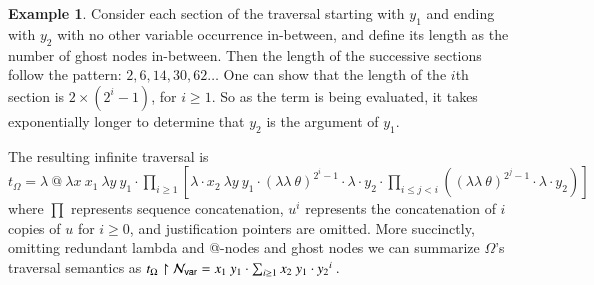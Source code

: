 \documentclass{elsarticle}
\newif\iflongversion
\theoremstyle{plain}
\theoremstyle{definition}
\newtheorem{example}{Example}[section]
\newcommand\Nodes{\mathcal{N}}%
\newcommand\NodesVar{\Nodes_{\sf var}}%
\newcommand{\ghostlmd}{{\lambda\!\!\lambda}}
\newcommand{\ghostvar}{\theta}
\newcommand\ExtendedNodesVar{\NodesVar^\ghostvar}
\begin{document}
\begin{example}
    Consider each section of the traversal starting with $y_1$ and ending with $y_2$ with no other variable occurrence in-between, and define its length as the number of ghost nodes in-between. Then the length of the successive sections follow the pattern: $2,6,14,30,62\ldots$
    One can show that the length of the $i$th section is $2\times(2^i-1)$, for $i\geq1$.
    So as the term is being evaluated, it takes exponentially longer to determine that $y_2$ is the argument of $y_1$.
\iflongversion
    The resulting infinite traversal is expressed as follows:
    \begin{equation*}
    t_\Omega = \lambda ~ @ ~ \lambda x ~  x_1 ~ \lambda y ~ y_1
    \cdot  \sum_{i\geq 1}
        \left[
            \lambda \cdot x_2 ~ \lambda y ~ y_1 \cdot
             {(\ghostlmd\ \ghostvar)}^{2^i -1}\cdot \lambda \cdot y_2
                 \cdot \sum_{i\leq j<i}
                    \left(
                        {(\ghostlmd\ \ghostvar)}^{2^j -1}
                        \cdot
                        \lambda \cdot y_2
                    \right)
        \right]
    \end{equation*}
    where $\prod$ represents sequence concatenation and $u^i$ represents the concatenation of $i$ copies of $u$ for $i\geq 0$, and justification pointers are omitted.

    More succinctly, omitting redundant lambda and @-nodes to keep only variable nodes:
    $t_\Omega \filter \ExtendedNodesVar =  x_1 ~ y_1
        \cdot  \prod_{i\geq 1}
            \left[
                x_2 ~ y_1 \cdot
                 \ghostvar^{2^i -1}\cdot y_2 \cdot
                     \prod_{1\leq j <i} (\ghostvar^{2^j -1} \cdot y_2)
            \right]
    $.
    Without ghost nodes, we can thus summarize $\Omega$'s traversal semantics as
    $
        t_\Omega \filter \NodesVar =  x_1 ~ y_1
        \cdot  \prod_{i\geq 1} x_2 ~ y_1 \cdot {y_2}^i \ .
    $
\else
The resulting infinite traversal is
$t_\Omega = \lambda ~ @ ~ \lambda x ~  x_1 ~ \lambda y ~ y_1
\cdot  \prod_{i\geq 1}
    \left[
        \lambda \cdot x_2 ~ \lambda y ~ y_1 \cdot
         {(\ghostlmd\ \ghostvar)}^{2^i -1}\cdot \lambda \cdot y_2
             \cdot \prod_{i\leq j<i}
                \left(
                    {(\ghostlmd\ \ghostvar)}^{2^j -1}
                    \cdot
                    \lambda \cdot y_2
                \right)
    \right]
$
where $\prod$ represents sequence concatenation, $u^i$ represents the concatenation of $i$ copies of $u$ for $i\geq 0$, and justification pointers are omitted.
More succinctly, omitting redundant lambda and @-nodes and ghost nodes we can summarize $\Omega$'s traversal semantics as
$
    t_\Omega \filter \NodesVar =  x_1 ~ y_1
    \cdot  \sum_{i\geq 1} x_2 ~ y_1 \cdot {y_2}^i \ .
$
\fi
\end{example}
\end{document}
